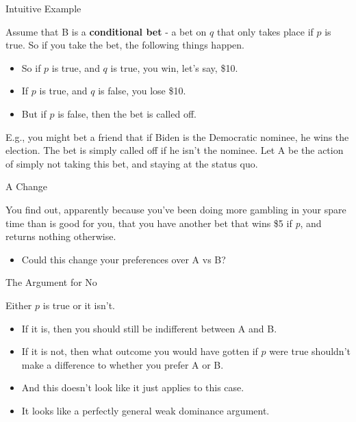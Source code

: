 \documentclass[
  ignorenonframetext,
]{beamer}
\providecommand{\tightlist}{%
  \setlength{\itemsep}{0pt}\setlength{\parskip}{0pt}}
\renewcommand{\,}{\text{, }}
\begin{document}
\begin{frame}{Intuitive Example}
\protect\hypertarget{intuitive-example}{}

Assume that B is a \textbf{conditional bet} - a bet on \(q\) that only
takes place if \(p\) is true. So if you take the bet, the following
things happen.

\begin{itemize}
\tightlist
\item
  So if \(p\) is true, and \(q\) is true, you win, let's say, \$10.
\item
  If \(p\) is true, and \(q\) is false, you lose \$10.
\item
  But if \(p\) is false, then the bet is called off.
\end{itemize}

E.g., you might bet a friend that if Biden is the Democratic nominee, he
wins the election. The bet is simply called off if he isn't the nominee.
Let A be the action of simply not taking this bet, and staying at the
status quo.

\end{frame}

\begin{frame}{A Change}
\protect\hypertarget{a-change}{}

You find out, apparently because you've been doing more gambling in your
spare time than is good for you, that you have another bet that wins \$5
if \emph{p}, and returns nothing otherwise.

\begin{itemize}
\tightlist
\item
  Could this change your preferences over A vs B?
\end{itemize}

\end{frame}

\begin{frame}{The Argument for No}
\protect\hypertarget{the-argument-for-no}{}

Either \(p\) is true or it isn't.

\begin{itemize}
\tightlist
\item
  If it is, then you should still be indifferent between A and B.
\item
  If it is not, then what outcome you would have gotten if \(p\) were
  true shouldn't make a difference to whether you prefer A or B.
\item
  And this doesn't look like it just applies to this case.
\item
  It looks like a perfectly general weak dominance argument.
\end{itemize}

\end{frame}
\end{document}
